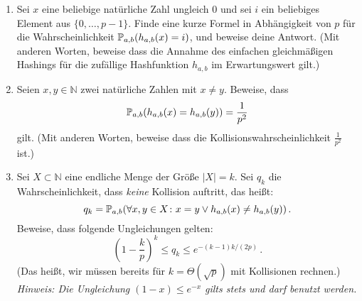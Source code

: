 \documentclass{uebung_cs}
\begin{document}
\begin{aufgabe}
  \begin{enumerate}
      \item \mittel Sei $x$ eine beliebige natürliche Zahl ungleich $0$ und sei $i$ ein beliebiges Element aus $\{0,\dots,p-1\}$.
      Finde eine kurze Formel in Abhängigkeit von $p$ für die Wahrscheinlichkeit $\mathbb P_{a,b}(h_{a,b}(x)=i)$, und beweise deine Antwort. (Mit anderen Worten, beweise dass die Annahme des einfachen gleichmäßigen Hashings für die zufällige Hashfunktion $h_{a,b}$ im Erwartungswert gilt.)
      \item \note Seien $x,y\in\mathbb N$ zwei natürliche Zahlen mit $x\ne y$.
      Beweise, dass \[\mathbb P_{a,b}(h_{a,b}(x)=h_{a,b}(y))=\frac{1}{p^2}\] gilt. (Mit anderen Worten, beweise dass die Kollisionswahrscheinlichkeit $\frac{1}{p^2}$ ist.)
      \item \note Sei $X\subset\mathbb N$ eine endliche Menge der Größe $|X|=k$. Sei $q_k$ die Wahrscheinlichkeit, dass \emph{keine} Kollision auftritt, das heißt:
      \[q_k=\mathbb P_{a,b}(\forall x,y\in X\colon x=y \vee h_{a,b}(x)\ne h_{a,b}(y))\,.\]
      Beweise, dass folgende Ungleichungen gelten:
      \[
          \left(1-\frac{k}{p}\right)^k\le q_k \leq e^{-(k-1)k/(2p)}\,.
      \]
      (Das heißt, wir müssen bereits für $k=\Theta(\sqrt{p})$ mit Kollisionen rechnen.)\\
      \emph{Hinweis: Die Ungleichung $(1-x)\le e^{-x}$ gilts stets und darf benutzt werden.}
  \end{enumerate}
  

\end{aufgabe}
\end{document}
